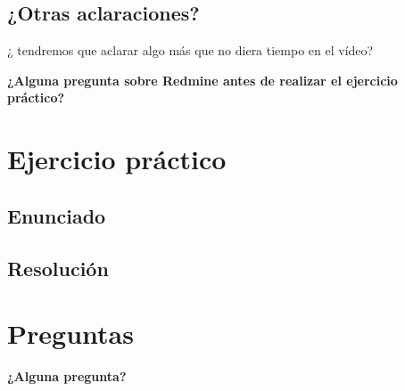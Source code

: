 \documentclass[
xcolor={svgnames},
hyperref={colorlinks,citecolor=DeepPink4,linkcolor=Black,urlcolor=DarkBlue}
]{beamer}
\begin{document}
\subsection{¿Otras aclaraciones?}

\begin{frame}
	¿ tendremos que aclarar algo más que no diera tiempo en el vídeo?
\end{frame}

\begin{frame}
	\begin{center}

		{\Large 		\textbf{¿Alguna pregunta sobre Redmine antes de realizar el ejercicio práctico?}}

	\end{center}

\end{frame}

\section{Ejercicio práctico}

\subsection{Enunciado}
\begin{frame}

\end{frame}

\subsection{Resolución}

\begin{frame}

\end{frame}

\section{Preguntas}

\begin{frame}
	\begin{center}
		{\Large 		\textbf{¿Alguna pregunta?}}
	\end{center}
\end{frame}

%
%	
%	 
%
%

\begin{frame}[plain]
	\titlepage
\end{frame}
\end{document}
